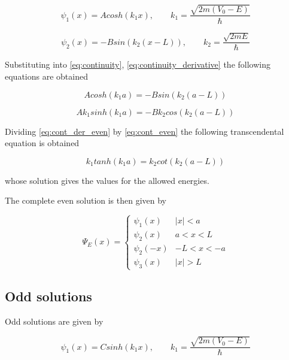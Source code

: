 \documentclass{article}
\begin{document}
\begin{equation}
\psi_{1}(x) = A cosh(k_{1} x), \qquad k_{1} = \frac{\sqrt{2m(V_{0} - E)}}{\hbar}
\end{equation}

\begin{equation}
\psi_{2}(x) = - B sin(k_{2}(x-L)), \qquad k_{2} = \frac{\sqrt{2mE}}{\hbar}
\end{equation}

Substituting into \eqref{eq:continuity}, \eqref{eq:continuity_derivative} the following equations are obtained

\begin{equation}
\label{eq:cont_even}
A cosh(k_{1}a) =  - B sin(k_{2}(a-L))
\end{equation}

\begin{equation}
\label{eq:cont_der_even}
A k_{1} sinh(k_{1}a) = - B k_{2} cos(k_{2}(a-L))
\end{equation}

Dividing \eqref{eq:cont_der_even} by \eqref{eq:cont_even} the following transcendental equation is obtained

\begin{equation}
\label{eq:trans_even}
k_{1} tanh(k_{1}a) = k_{2} cot(k_{2}(a-L))
\end{equation}

whose solution gives the values for the allowed energies.

The complete even solution is then given by

\begin{equation}
\Psi_{E}(x) = 
  \begin{cases} 
      \psi_{1}(x) & \left|x\right| < a \\
      \psi_{2}(x) & a < x < L \\
      \psi_{2}(-x) & -L < x < -a \\
      \psi_{3}(x) & \left|x\right| > L
   \end{cases}
\end{equation}

\subsection{Odd solutions}
Odd solutions are given by

\begin{equation}
\psi_{1}(x) = C sinh(k_{1} x), \qquad k_{1} = \frac{\sqrt{2m(V_{0} - E)}}{\hbar}
\end{equation}
\end{document}
